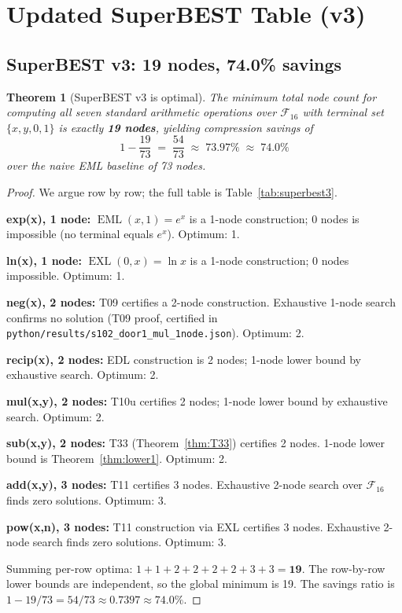 \documentclass[12pt,a4paper]{article}
\newtheorem{theorem}{Theorem}[section]
\theoremstyle{definition}
\newcommand{\EML}{\operatorname{EML}}
\newcommand{\EXL}{\operatorname{EXL}}
\begin{document}
\section{Updated SuperBEST Table (v3)}

\subsection{SuperBEST v3: 19 nodes, 74.0\% savings}

\begin{theorem}[SuperBEST v3 is optimal]\label{thm:superbest3}
The minimum total node count for computing all seven standard arithmetic
operations over $\mathcal{F}_{16}$ with terminal set $\{x,y,0,1\}$ is
exactly \textbf{19 nodes}, yielding compression savings of
\[
  1 - \frac{19}{73} \;=\; \frac{54}{73} \;\approx\; 73.97\% \;\approx\; \mathbf{74.0\%}
\]
over the naive EML baseline of 73 nodes.
\end{theorem}

\begin{proof}
We argue row by row; the full table is Table~\ref{tab:superbest3}.

\noindent\textbf{exp(x), 1 node:}
$\EML(x,1)=e^x$ is a 1-node construction; 0 nodes is impossible
(no terminal equals $e^x$).  Optimum: 1.

\noindent\textbf{ln(x), 1 node:}
$\EXL(0,x)=\ln x$ is a 1-node construction; 0 nodes impossible.  Optimum: 1.

\noindent\textbf{neg(x), 2 nodes:}
T09 certifies a 2-node construction.  Exhaustive 1-node search confirms no
solution (T09 proof, certified in \texttt{python/results/s102\_door1\_mul\_1node.json}).
Optimum: 2.

\noindent\textbf{recip(x), 2 nodes:}
EDL construction is 2 nodes; 1-node lower bound by exhaustive search.
Optimum: 2.

\noindent\textbf{mul(x,y), 2 nodes:}
T10u certifies 2 nodes; 1-node lower bound by exhaustive search.  Optimum: 2.

\noindent\textbf{sub(x,y), 2 nodes:}
T33 (Theorem~\ref{thm:T33}) certifies 2 nodes.  1-node lower bound is
Theorem~\ref{thm:lower1}.  Optimum: 2.

\noindent\textbf{add(x,y), 3 nodes:}
T11 certifies 3 nodes.  Exhaustive 2-node search over $\mathcal{F}_{16}$
finds zero solutions.  Optimum: 3.

\noindent\textbf{pow(x,n), 3 nodes:}
T11 construction via EXL certifies 3 nodes.  Exhaustive 2-node search
finds zero solutions.  Optimum: 3.

\smallskip
Summing per-row optima: $1+1+2+2+2+2+3+3 = \mathbf{19}$.
The row-by-row lower bounds are independent, so the global minimum is 19.
The savings ratio is $1 - 19/73 = 54/73 \approx 0.7397 \approx 74.0\%$.
\end{proof}
\end{document}
